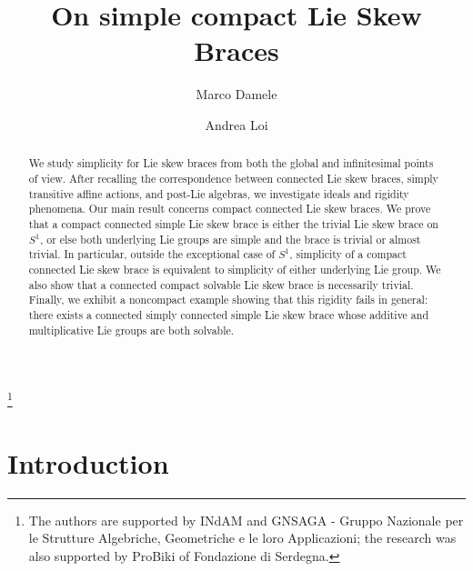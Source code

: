 \documentclass[reqno]{amsart}
\begin{document}
\title[On simple compact Lie Skew Braces]{On simple compact Lie Skew Braces}


\author{Marco Damele}
\address{(Marco Damele) Dipartimento di Matematica \\
         Universit\`a di Cagliari (Italy)}


\author{Andrea Loi}
\address{(Andrea Loi) Dipartimento di Matematica \\
         Universit\`a di Cagliari (Italy)}
         

\thanks{
The authors are supported by INdAM and  GNSAGA - Gruppo Nazionale per le Strutture Algebriche, Geometriche e le loro Applicazioni;   the research was also supported by ProBiki of Fondazione di Serdegna.}



\begin{abstract}
We study simplicity for Lie skew braces from both the global and
infinitesimal points of view. After recalling the correspondence
between connected Lie skew braces, simply transitive affine actions,
and post-Lie algebras, we investigate ideals 
and rigidity phenomena.
Our main result concerns compact connected Lie skew braces. We prove
that a compact connected simple Lie skew brace is either the trivial
Lie skew brace on \(S^1\), or else both underlying Lie groups are
simple and the brace is trivial or almost trivial. In particular,
outside the exceptional case of \(S^1\), simplicity of a compact
connected Lie skew brace is equivalent to simplicity of either
underlying Lie group.
We also show that a connected compact solvable Lie skew brace is
necessarily trivial. Finally, we exhibit a noncompact example showing
that this rigidity fails in general: there exists a connected simply
connected simple Lie skew brace whose additive and multiplicative Lie
groups are both solvable.
\end{abstract}


\maketitle

\tableofcontents  
\section{Introduction}\label{sec:intro}
\end{document}
